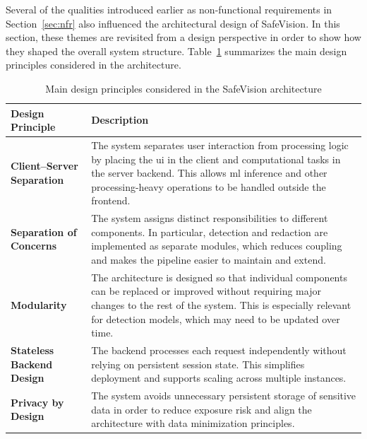 \label{design_principles}

Several of the qualities introduced earlier as non-functional requirements in Section~\ref{sec:nfr} also influenced the architectural design of \gls{SafeVision}. In this section, these themes are revisited from a design perspective in order to show how they shaped the overall system structure. Table~\ref{tab:design_principles} summarizes the main design principles considered in the architecture.

\begin{table}[H]
\centering
\begin{tabular}{|p{5cm}|p{9cm}|}
\hline
\textbf{Design Principle} & \textbf{Description} \\ \hline

\textbf{Client--Server Separation} & 
The system separates user interaction from processing logic by placing the \acrshort{ui} in the client and computational tasks in the server backend. This allows \acrshort{ml} \gls{inference} and other processing-heavy operations to be handled outside the frontend. \\ \hline

\textbf{Separation of Concerns} & 
The system assigns distinct responsibilities to different components. In particular, detection and redaction are implemented as separate modules, which reduces coupling and makes the pipeline easier to maintain and extend. \\ \hline

\textbf{Modularity} & 
The architecture is designed so that individual components can be replaced or improved without requiring major changes to the rest of the system. This is especially relevant for detection models, which may need to be updated over time. \\ \hline

\textbf{Stateless Backend Design} & 
The backend processes each request independently without relying on persistent session state. This simplifies deployment and supports scaling across multiple instances. \\ \hline

\textbf{Privacy by Design} & 
The system avoids unnecessary persistent storage of sensitive data in order to reduce exposure risk and align the architecture with data minimization principles. \\ \hline

\end{tabular}
\caption{Main design principles considered in the \gls{SafeVision} architecture}
\label{tab:design_principles}
\end{table}

